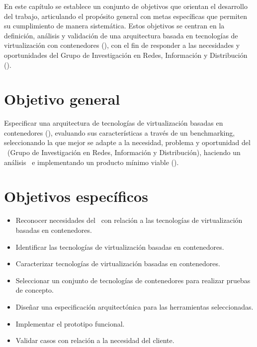 \label{cap:objetivos}
En este capítulo se establece un conjunto de objetivos que orientan el desarrollo del trabajo, articulando el propósito general con metas específicas que permiten su cumplimiento de manera sistemática. Estos objetivos se centran en la definición, análisis y validación de una arquitectura basada en tecnologías de virtualización con contenedores (\VBC), con el fin de responder a las necesidades y oportunidades del Grupo de Investigación en Redes, Información y Distribución (\GRID). 

\section{Objetivo general}
\label{cap:objetivoGeneral}

Especificar una arquitectura de tecnologías de virtualización basadas en contenedores (\VBC), evaluando sus características a través de un benchmarking, seleccionando la que mejor se adapte a la necesidad, problema y oportunidad del \GRID\ (Grupo de Investigación en Redes, Información y Distribución), haciendo un análisis \DAR\ e implementando un producto mínimo viable (\PMV).

\section{Objetivos específicos}
\label{cap:objetivosEspecificos}
\begin{itemize}
    \item Reconocer necesidades del \GRID\ con relación a las tecnologías de virtualización basadas en contenedores.
    \item Identificar las tecnologías de virtualización basadas en contenedores.
    \item Caracterizar tecnologías de virtualización basadas en contenedores.
    \item Seleccionar un conjunto de tecnologías de contenedores para realizar pruebas de concepto.
    \item Diseñar una especificación arquitectónica para las herramientas seleccionadas.
    \item Implementar el prototipo funcional.
    \item Validar casos con relación a la necesidad del cliente.
\end{itemize}